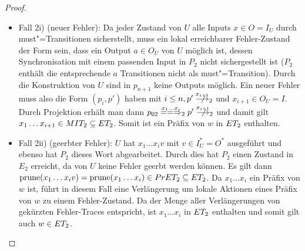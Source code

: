 \begin{proof}
\begin{itemize}
\begin{itemize}
        \item Fall 2i) (neuer Fehler): Da jeder Zustand von $U$ alle Inputs
          $x\in O=I_U$ durch must"=Transitionen sicherstellt, muss ein lokal
          erreichbarer Fehler-Zustand der Form sein, dass ein Output $a\in O_U$
          von $U$ möglich ist, dessen Synchronisation mit einem passenden Input
          in $P_2$ nicht sichergestellt ist ($P_2$ enthält die entsprechende
          $a$ Transitionen nicht als must"=Transition). Durch die Konstruktion
          von $U$ sind in $p_{n+1}$ keine Outputs möglich. Ein neuer Fehler
          muss also die Form $(p_i,p')$ haben mit $i\leq n,
          p'\nmust[x_{i+1}]_2$ und $x_{i+1}\in O_U=I$. Durch Projektion erhält
          man dann $p_{02}\lweakmay[x_1\dots x_i]_2p'\nmust[x_{i+1}]_2$ und
          damit gilt $x_1\dots x_{i+1}\in MIT _2\subseteq ET _2$. Somit ist
          ein Präfix von $w$ in $ET _2$ enthalten.
        \item Fall 2ii) (geerbter Fehler): $U$ hat $x_1\dots x_iv$ mit $v\in
          I_U^*=O^*$ ausgeführt und ebenso hat $P_2$ dieses Wort abgearbeitet.
          Durch dies hat $P_2$ einen Zustand  in $E_2$ erreicht, da von $U$
          keine Fehler geerbt werden können. Es gilt dann $\mathrm{prune} (x_1\dots
          x_iv) = \mathrm{prune} (x_1\dots x_i)\in PrET _2\subseteq ET _2$. Da
          $x_1\dots x_i$ ein Präfix von $w$ ist, führt in diesem Fall eine
          Verlängerung um lokale Aktionen eines Präfix von $w$ zu einem
          Fehler-Zustand. Da \ET{} der Menge aller Verlängerungen von gekürzten
          Fehler-Traces entspricht, ist $x_1\dots x_i$ in $ET
          _2$ enthalten und somit gilt auch $w\in ET _2$.
      \end{itemize}
  \end{itemize}


\end{proof}
